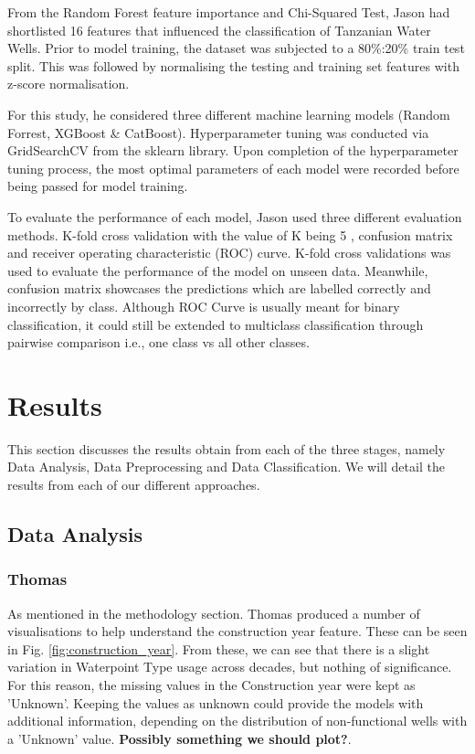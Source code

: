 \documentclass[conference]{IEEEtran}
\begin{document}
From the Random Forest feature importance and Chi-Squared Test, Jason had shortlisted 16 features that influenced the classification of Tanzanian Water Wells. Prior to model training, the dataset was subjected to a 80\%:20\% train test split. This was followed by normalising the testing and training set features with z-score normalisation.

For this study, he considered three different machine learning models  (Random Forrest, XGBoost \& CatBoost). Hyperparameter tuning was conducted via GridSearchCV \cite{gridsearch} from the sklearn library. Upon completion of the hyperparameter tuning process, the most optimal parameters of each model were recorded before being passed for model training. 

To evaluate the performance of each model, Jason used three different evaluation methods. K-fold cross validation with the value of K being 5 , confusion matrix and receiver operating characteristic (ROC) curve. K-fold cross validations was used to evaluate the performance of the model on unseen data. Meanwhile, confusion matrix showcases the predictions which are labelled correctly and incorrectly by class. Although ROC Curve is usually meant for binary classification, it could still be extended to multiclass classification through pairwise comparison i.e., one class vs all other classes.   

\section{Results} \label{ref:results}

This section discusses the results obtain from each of the three stages, namely Data Analysis, Data Preprocessing and Data Classification. We will detail the results from each of our different approaches.

\subsection{Data Analysis}

\subsubsection{Thomas}

As mentioned in the methodology section. Thomas produced a number of visualisations to help understand the construction year feature. These can be seen in Fig. \ref{fig:construction_year}. From these, we can see that there is a slight variation in Waterpoint Type usage across decades, but nothing of significance. For this reason, the missing values in the Construction year were kept as 'Unknown'. Keeping the values as unknown could provide the models with additional information, depending on the distribution of non-functional wells with a 'Unknown' value. \textbf{Possibly something we should plot?}.
\end{document}
